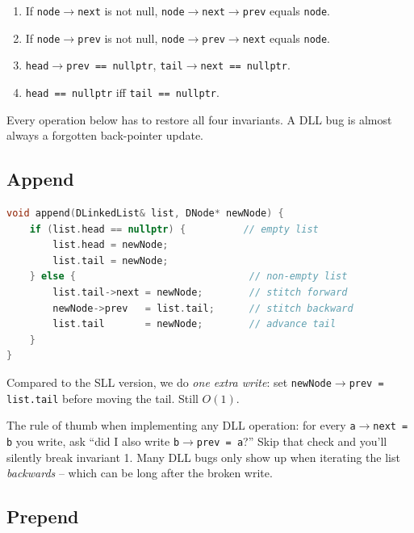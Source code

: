 \documentclass[11pt]{article}
\begin{document}
\begin{ideabox}
\begin{enumerate}[leftmargin=*]
  \item If \texttt{node$\to$next} is not null,
        \texttt{node$\to$next$\to$prev} equals \texttt{node}.
  \item If \texttt{node$\to$prev} is not null,
        \texttt{node$\to$prev$\to$next} equals \texttt{node}.
  \item \texttt{head$\to$prev == nullptr}, \texttt{tail$\to$next == nullptr}.
  \item \texttt{head == nullptr} iff \texttt{tail == nullptr}.
\end{enumerate}
Every operation below has to restore all four invariants. A DLL
bug is almost always a forgotten back-pointer update.
\end{ideabox}

\subsection{Append}

\begin{examplebox}
\begin{lstlisting}[basicstyle=\ttfamily\small,frame=single,language=C++]
void append(DLinkedList& list, DNode* newNode) {
    if (list.head == nullptr) {          // empty list
        list.head = newNode;
        list.tail = newNode;
    } else {                              // non-empty list
        list.tail->next = newNode;        // stitch forward
        newNode->prev   = list.tail;      // stitch backward
        list.tail       = newNode;        // advance tail
    }
}
\end{lstlisting}
Compared to the SLL version, we do \emph{one extra write}: set
\texttt{newNode$\to$prev = list.tail} before moving the tail. Still
$O(1)$.
\end{examplebox}

\begin{warnbox}
The rule of thumb when implementing any DLL operation: for every
\texttt{a$\to$next = b} you write, ask ``did I also write
\texttt{b$\to$prev = a}?'' Skip that check and you'll silently break
invariant 1. Many DLL bugs only show up when iterating the list
\emph{backwards} -- which can be long after the broken write.
\end{warnbox}

\subsection{Prepend}
\end{document}
